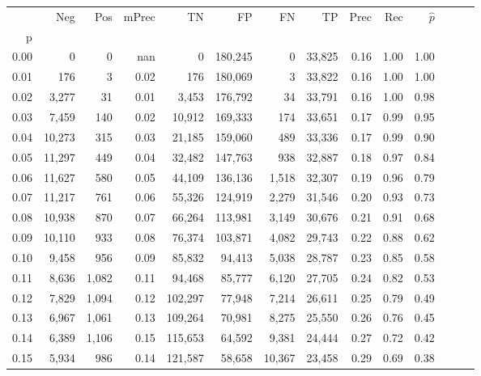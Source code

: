 \begin{tabular}{rrrrrrrrrrrrrr}
\toprule
{} &     Neg &    Pos & mPrec &       TN &       FP &      FN &      TP &  Prec &   Rec & $\hat{p}$ \\
p    &         &        &       &          &          &         &         &       &       &           \\
\midrule
0.00 &       0 &      0 &   nan &        0 &  180,245 &       0 &  33,825 &  0.16 &  1.00 &      1.00 \\
0.01 &     176 &      3 &  0.02 &      176 &  180,069 &       3 &  33,822 &  0.16 &  1.00 &      1.00 \\
0.02 &   3,277 &     31 &  0.01 &    3,453 &  176,792 &      34 &  33,791 &  0.16 &  1.00 &      0.98 \\
0.03 &   7,459 &    140 &  0.02 &   10,912 &  169,333 &     174 &  33,651 &  0.17 &  0.99 &      0.95 \\
0.04 &  10,273 &    315 &  0.03 &   21,185 &  159,060 &     489 &  33,336 &  0.17 &  0.99 &      0.90 \\
0.05 &  11,297 &    449 &  0.04 &   32,482 &  147,763 &     938 &  32,887 &  0.18 &  0.97 &      0.84 \\
0.06 &  11,627 &    580 &  0.05 &   44,109 &  136,136 &   1,518 &  32,307 &  0.19 &  0.96 &      0.79 \\
0.07 &  11,217 &    761 &  0.06 &   55,326 &  124,919 &   2,279 &  31,546 &  0.20 &  0.93 &      0.73 \\
0.08 &  10,938 &    870 &  0.07 &   66,264 &  113,981 &   3,149 &  30,676 &  0.21 &  0.91 &      0.68 \\
0.09 &  10,110 &    933 &  0.08 &   76,374 &  103,871 &   4,082 &  29,743 &  0.22 &  0.88 &      0.62 \\
0.10 &   9,458 &    956 &  0.09 &   85,832 &   94,413 &   5,038 &  28,787 &  0.23 &  0.85 &      0.58 \\
0.11 &   8,636 &  1,082 &  0.11 &   94,468 &   85,777 &   6,120 &  27,705 &  0.24 &  0.82 &      0.53 \\
0.12 &   7,829 &  1,094 &  0.12 &  102,297 &   77,948 &   7,214 &  26,611 &  0.25 &  0.79 &      0.49 \\
0.13 &   6,967 &  1,061 &  0.13 &  109,264 &   70,981 &   8,275 &  25,550 &  0.26 &  0.76 &      0.45 \\
0.14 &   6,389 &  1,106 &  0.15 &  115,653 &   64,592 &   9,381 &  24,444 &  0.27 &  0.72 &      0.42 \\
0.15 &   5,934 &    986 &  0.14 &  121,587 &   58,658 &  10,367 &  23,458 &  0.29 &  0.69 &      0.38 \\

\end{tabular}
